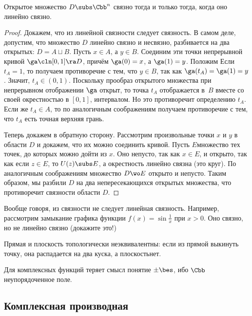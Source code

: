 \documentclass[a4paper]{article}
\begin{document}
\begin{stm}
Открытое множество $D \subs \Cbb^n$ связно тогда и только тогда, когда оно линейно связно.
\end{stm}
\begin{proof}
 Докажем, что из линейной связности следует связность.
В самом деле, допустим, что множество $D$ линейно связно и несвязно,  разбивается на два открытых: $D = A \sqcup B$.
Пусть $x \in A$, а $y \in B$. Соединим эти точки непрерывной кривой $\ga\cln[0,1]\ra D$, причём $\ga(0)=x$, а $\ga(1)=y$.
Положим
Если $t_A = 1$, то получаем противоречие с тем, что $y \in B$, так
как $\ga(t_A)=\ga(1)=y$. Значит, $t_A \in (0,1)$. Поскольку прообраз открытого множества при непрерывном
отображении $\ga$ открыт, то точка $t_A$ отображается в~$B$ вместе со своей окрестностью в $[0,1]$,  интервалом. Но это противоречит
определению $t_A$. Если же $t_A \in A$, то по аналогичным соображениям получаем противоречие с тем, что $t_A$ есть точная верхняя грань.

 Теперь докажем в обратную сторону.
Рассмотрим произвольные точки $x$ и $y$ в области $D$ и докажем, что их можно соединить кривой.
Пусть $E$\т множество тех точек, до которых можно дойти из $x$. Оно непусто, так как $x \in E$, и открыто,
так как если $z \in E$, то $U(z) \subs E$, а окрестность линейно связна (это круг).
По аналогичным соображениям множество $D \wo E$ открыто и непусто. Таким образом, мы разбили $D$ на два непересекающихся
открытых множества, что противоречит связности области $D$.
\end{proof}

\begin{note}
Вообще говоря, из связности не следует линейная связность. Например, рассмотрим замыкание графика функции $f(x)=\sin \frac1x$ при $x > 0$.
Оно связно, но не линейно связно (докажите это!)
\end{note}

\begin{note}
Прямая и плоскость топологически неэквивалентны: если из прямой выкинуть точку, она распадается на два куска,
а плоскость\т нет.
\end{note}

\begin{note}
Для комплексных функций теряет смысл понятие $\pm \bes$, ибо $\Cbb$\т неупорядоченное поле.
\end{note}

\subsection{Комплексная производная}
\end{document}
